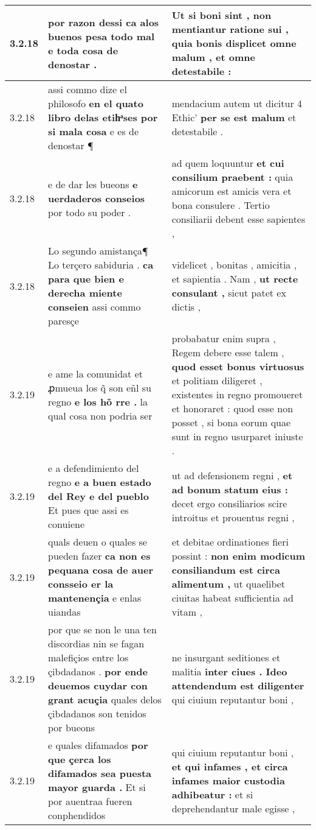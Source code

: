 \begin{tabular}{|p{1cm}|p{6.5cm}|p{6.5cm}|}
3.2.18 & por razon dessi \textbf{ ca alos buenos pesa todo mal } e toda cosa de denostar . & Ut si boni sint , non mentiantur ratione sui , \textbf{ quia bonis displicet omne malum , } et omne detestabile : \\\hline
3.2.18 & assi commo dize el philosofo \textbf{ en el quato libro delas etihͣses por si mala cosa } e es de denostar ¶ & mendacium autem ut dicitur 4 Ethic’ \textbf{ per se est malum } et detestabile . \\\hline
3.2.18 & e de dar les bueons \textbf{ e uerdaderos conseios } por todo su poder . & ad quem loquuntur \textbf{ et cui consilium praebent : } quia amicorum est amicis vera et bona consulere . Tertio consiliarii debent esse sapientes , \\\hline
3.2.18 & Lo segundo amistança¶ Lo terçero sabiduria . \textbf{ ca para que bien e derecha miente conseien } assi commo paresçe & videlicet , bonitas , amicitia , et sapientia . Nam , \textbf{ ut recte consulant , } sicut patet ex dictis , \\\hline
3.2.19 & e ame la comunidat et ꝓmueua los q̃ son eñl su regno \textbf{ e los hõ rre . } la qual cosa non podria ser & probabatur enim supra , Regem debere esse talem , \textbf{ quod esset bonus virtuosus } et politiam diligeret , existentes in regno promoueret et honoraret : quod esse non posset , si bona eorum quae sunt in regno usurparet iniuste . \\\hline
3.2.19 & e a defendimiento del regno \textbf{ e a buen estado del Rey e del pueblo } Et pues que assi es conuiene & ut ad defensionem regni , \textbf{ et ad bonum statum eius : } decet ergo consiliarios scire introitus et prouentus regni , \\\hline
3.2.19 & quals deuen o quales se pueden fazer \textbf{ ca non es pequana cosa de auer consseio er la mantenençia } e enlas uiandas & et debitae ordinationes fieri possint : \textbf{ non enim modicum consiliandum est circa alimentum , } ut quaelibet ciuitas habeat sufficientia ad vitam , \\\hline
3.2.19 & por que se non le una ten discordias nin se fagan malefiçios entre los çibdadanos . \textbf{ por ende deuemos cuydar con grant acuçia } quales delos çibdadanos son tenidos por bueons & ne insurgant seditiones et malitia \textbf{ inter ciues . Ideo attendendum est diligenter } qui ciuium reputantur boni , \\\hline
3.2.19 & e quales difamados \textbf{ por que çerca los difamados sea puesta mayor guarda . } Et si por auentraa fueren conphendidos & qui ciuium reputantur boni , \textbf{ et qui infames , et circa infames maior custodia adhibeatur : } et si deprehendantur male egisse , \\\hline

\end{tabular}
